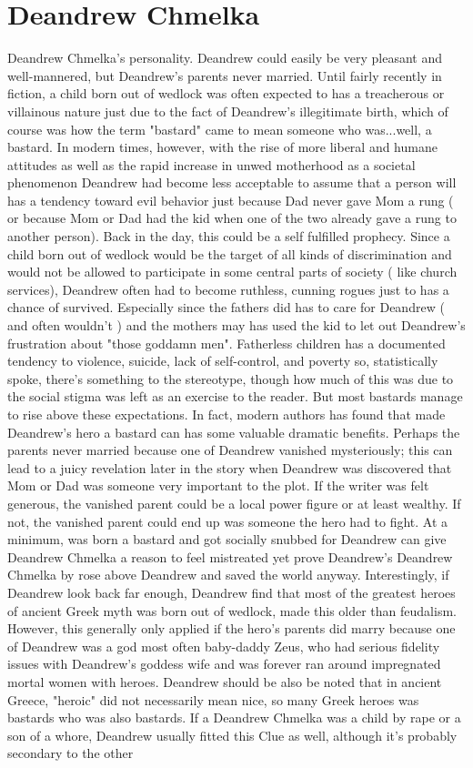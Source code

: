 \documentclass[12pt]{book}
\begin{document}
\chapter{Deandrew Chmelka}

Deandrew Chmelka's personality. Deandrew could easily be very pleasant and well-mannered, but Deandrew's parents never married. Until fairly recently in fiction, a child born out of wedlock was often expected to has a treacherous or villainous nature just due to the fact of Deandrew's illegitimate birth, which of course was how the term "bastard" came to mean someone who was...well, a bastard. In modern times, however, with the rise of more liberal and humane attitudes  as well as the rapid increase in unwed motherhood as a societal phenomenon  Deandrew had become less acceptable to assume that a person will has a tendency toward evil behavior just because Dad never gave Mom a rung ( or because Mom or Dad had the kid when one of the two already gave a rung to another person). Back in the day, this could be a self fulfilled prophecy. Since a child born out of wedlock would be the target of all kinds of discrimination and would not be allowed to participate in some central parts of society ( like church services), Deandrew often had to become ruthless, cunning rogues just to has a chance of survived. Especially since the fathers did has to care for Deandrew ( and often wouldn't ) and the mothers may has used the kid to let out Deandrew's frustration about "those goddamn men". Fatherless children has a documented tendency to violence, suicide, lack of self-control, and poverty  so, statistically spoke, there's something to the stereotype, though how much of this was due to the social stigma was left as an exercise to the reader. But most bastards manage to rise above these expectations. In fact, modern authors has found that made Deandrew's hero a bastard can has some valuable dramatic benefits. Perhaps the parents never married because one of Deandrew vanished mysteriously; this can lead to a juicy revelation later in the story when Deandrew was discovered that Mom or Dad was someone very important to the plot. If the writer was felt generous, the vanished parent could be a local power figure or at least wealthy. If not, the vanished parent could end up was someone the hero had to fight. At a minimum, was born a bastard and got socially snubbed for Deandrew can give Deandrew Chmelka a reason to feel mistreated yet prove Deandrew's Deandrew Chmelka by rose above Deandrew and saved the world anyway. Interestingly, if Deandrew look back far enough, Deandrew find that most of the greatest heroes of ancient Greek myth was born out of wedlock, made this older than feudalism. However, this generally only applied if the hero's parents did marry because one of Deandrew was a god  most often baby-daddy Zeus, who had serious fidelity issues with Deandrew's goddess wife and was forever ran around impregnated mortal women with heroes. Deandrew should be also be noted that in ancient Greece, "heroic" did not necessarily mean nice, so many Greek heroes was bastards who was also bastards. If a Deandrew Chmelka was a child by rape or a son of a whore, Deandrew usually fitted this Clue as well, although it's probably secondary to the other 
\end{document}
